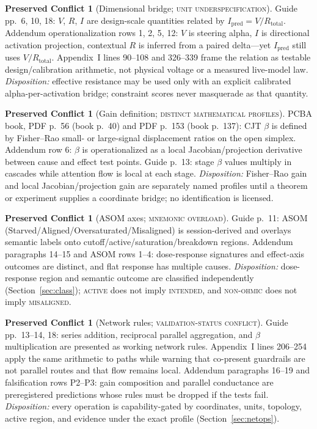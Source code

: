\documentclass[11pt]{amsart}
\theoremstyle{definition}
\newtheorem{conflict}[theorem]{Preserved Conflict}
\theoremstyle{remark}
\begin{document}
\begin{conflict}[Dimensional bridge; \textnormal{\textsc{unit underspecification}}]\label{conf:bridge}
Guide pp.~6, 10, 18: $V$, $R$, $I$ are design-scale quantities related by $I_{\mathrm{pred}}=V/R_{\mathrm{total}}$. Addendum operationalization rows 1, 2, 5, 12: $V$ is steering alpha, $I$ is directional activation projection, contextual $R$ is inferred from a paired delta---yet $I_{\mathrm{pred}}$ still uses $V/R_{\mathrm{total}}$. Appendix~I lines 90--108 and 326--339 frame the relation as testable design/calibration arithmetic, not physical voltage or a measured live-model law. \emph{Disposition:} effective resistance may be used only with an explicit calibrated alpha-per-activation bridge; constraint scores never masquerade as that quantity.
\end{conflict}

\begin{conflict}[Gain definition; \textnormal{\textsc{distinct mathematical profiles}}]\label{conf:gain}
PCBA book, PDF p.~56 (book p.~40) and PDF p.~153 (book p.~137): CJT $\beta$ is defined by Fisher--Rao small- or large-signal displacement ratios on the open simplex. Addendum row 6: $\beta$ is operationalized as a local Jacobian/projection derivative between cause and effect test points. Guide p.~13: stage $\beta$ values multiply in cascades while attention flow is local at each stage. \emph{Disposition:} Fisher--Rao gain and local Jacobian/projection gain are separately named profiles until a theorem or experiment supplies a coordinate bridge; no identification is licensed.
\end{conflict}

\begin{conflict}[ASOM axes; \textnormal{\textsc{mnemonic overload}}]\label{conf:asom}
Guide p.~11: ASOM (Starved/Aligned/Oversaturated/Misaligned) is session-derived and overlays semantic labels onto cutoff/active/saturation/breakdown regions. Addendum paragraphs 14--15 and ASOM rows 1--4: dose-response signatures and effect-axis outcomes are distinct, and flat response has multiple causes. \emph{Disposition:} dose-response region and semantic outcome are classified independently (Section~\ref{sec:class}); \textsc{active} does not imply \textsc{intended}, and \textsc{non-ohmic} does not imply \textsc{misaligned}.
\end{conflict}

\begin{conflict}[Network rules; \textnormal{\textsc{validation-status conflict}}]\label{conf:networks}
Guide pp.~13--14, 18: series addition, reciprocal parallel aggregation, and $\beta$ multiplication are presented as working network rules. Appendix~I lines 206--254 apply the same arithmetic to paths while warning that co-present guardrails are not parallel routes and that flow remains local. Addendum paragraphs 16--19 and falsification rows P2--P3: gain composition and parallel conductance are preregistered predictions whose rules must be dropped if the tests fail. \emph{Disposition:} every operation is capability-gated by coordinates, units, topology, active region, and evidence under the exact profile (Section~\ref{sec:netops}).
\end{conflict}
\end{document}
